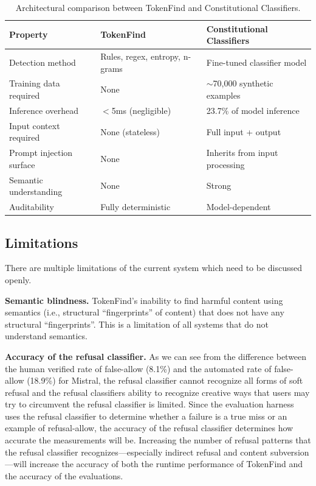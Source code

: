 \documentclass[11pt]{article}
\begin{document}
\begin{table}[ht]
\centering
\caption{Architectural comparison between TokenFind and Constitutional Classifiers.}
\label{tab:comparison}
\begin{tabular}{lll}
\toprule
Property & TokenFind & Constitutional Classifiers \\
\midrule
Detection method & Rules, regex, entropy, n-grams & Fine-tuned classifier model \\
Training data required & None & $\sim$70,000 synthetic examples \\
Inference overhead & $<$5ms (negligible) & 23.7\% of model inference \\
Input context required & None (stateless) & Full input + output \\
Prompt injection surface & None & Inherits from input processing \\
Semantic understanding & None & Strong \\
Auditability & Fully deterministic & Model-dependent \\
\bottomrule
\end{tabular}
\end{table}

\subsection{Limitations}
\label{sec:limitations}

There are multiple limitations of the current system which need to be discussed openly.

\textbf{Semantic blindness.} TokenFind's inability to find harmful content using semantics (i.e.,
structural ``fingerprints'' of content) that does not have any structural ``fingerprints''. This is a
limitation of all systems that do not understand semantics.

\textbf{Accuracy of the refusal classifier.} As we can see from the difference between the human
verified rate of false-allow (8.1\%) and the automated rate of false-allow (18.9\%) for Mistral, the refusal classifier cannot recognize all forms of soft refusal and the refusal classifiers ability to recognize
creative ways that users may try to circumvent the refusal classifier is limited. Since the evaluation
harness uses the refusal classifier to determine whether a failure is a true miss or an example of
refusal-allow, the accuracy of the refusal classifier determines how accurate the measurements will
be. Increasing the number of refusal patterns that the refusal classifier recognizes---especially indirect refusal and content subversion---will increase the accuracy of both the runtime performance
of TokenFind and the accuracy of the evaluations.
\end{document}
